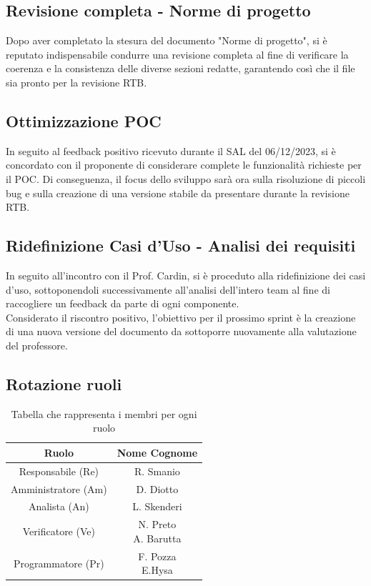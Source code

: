\documentclass{article}
\begin{document}
    \subsection{Revisione completa - Norme di progetto}
    Dopo aver completato la stesura del documento "Norme di progetto", si è reputato indispensabile condurre una revisione completa al fine di verificare la coerenza e la consistenza delle diverse sezioni redatte, garantendo così che il file sia pronto per la revisione RTB.
    \subsection{Ottimizzazione POC}
    In seguito al feedback positivo ricevuto durante il SAL del 06/12/2023, si è concordato con il proponente di considerare complete le funzionalità richieste per il POC. Di conseguenza, il focus dello sviluppo sarà ora sulla risoluzione di piccoli bug e sulla creazione di una versione stabile da presentare durante la revisione RTB.
    \subsection{Ridefinizione Casi d'Uso - Analisi dei requisiti}
    In seguito all'incontro con il Prof. Cardin, si è proceduto alla ridefinizione dei casi d'uso, sottoponendoli successivamente all'analisi dell'intero team al fine di raccogliere un feedback da parte di ogni componente. \\
    Considerato il riscontro positivo, l'obiettivo per il prossimo sprint è la creazione di una nuova versione del documento da sottoporre nuovamente alla valutazione del professore.
    \subsection{Rotazione ruoli}

    \begin{table}[H]
        \centering
        \begin{tabular}{|c|c|} 
            \hline
            \textbf{Ruolo} & \textbf{Nome Cognome} \\
            \hline \hline
            Responsabile (Re) & R. Smanio \\ 
            \hline
            Amministratore (Am) & D. Diotto \\ 
            \hline
            Analista (An) & L. Skenderi \\
            \hline
            Verificatore (Ve) & \makecell{N. Preto\\A. Barutta} \\
            \hline
            Programmatore (Pr) & \makecell{F. Pozza\\E.Hysa} \\
            \hline
        \end{tabular}
        \caption{Tabella che rappresenta i membri per ogni ruolo}
    \end{table}
\end{document}
